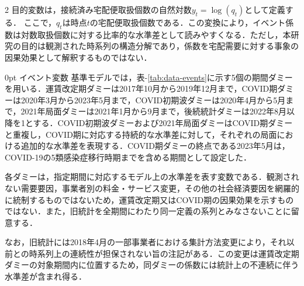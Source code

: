 \documentclass[uplatex,a4paper,10pt]{jsarticle}
\makeatletter
\renewcommand{\subsection}{\@startsection{subsection}{2}{\z@}%
  {\baselineskip}{0pt}%
  {\normalfont\gtfamily\bfseries\fontsize{10pt}{12pt}\selectfont}}
\makeatother
\begin{document}
\begin{multicols}{2}
目的変数は，接続済み宅配便取扱個数の自然対数$y_t=\log(q_t)$として定義する．
ここで，$q_t$は時点$t$の宅配便取扱個数である．この変換により，イベント係数は対数取扱個数に対する比率的な水準差として読みやすくなる．ただし，本研究の目的は観測された時系列の構造分解であり，係数を宅配需要に対する事象の因果効果として解釈するものではない．

\subsection{イベント変数}
基準モデルでは，表-\ref{tab:data-events}に示す5個の期間ダミーを用いる．運賃改定期ダミーは2017年10月から2019年12月まで，COVID期ダミーは2020年3月から2023年5月まで，COVID初期波ダミーは2020年4月から5月まで，2021年局面ダミーは2021年1月から9月まで，後続統計ダミーは2022年8月以降を1とする．COVID初期波ダミーおよび2021年局面ダミーはCOVID期ダミーと重複し，COVID期に対応する持続的な水準差に対して，それぞれの局面における追加的な水準差を表現する．COVID期ダミーの終点である2023年5月は，COVID-19の5類感染症移行時期\cite{mhlw_covid5rui}までを含める期間として設定した．

各ダミーは，指定期間に対応するモデル上の水準差を表す変数である．観測されない需要要因，事業者別の料金・サービス変更，その他の社会経済要因を網羅的に統制するものではないため，運賃改定期又はCOVID期の因果効果を示すものではない．また，旧統計を全期間にわたり同一定義の系列とみなさないことに留意する．

なお，旧統計には2018年4月の一部事業者における集計方法変更により，それ以前との時系列上の連続性が担保されない旨の注記がある．この変更は運賃改定期ダミーの対象期間内に位置するため，同ダミーの係数には統計上の不連続に伴う水準差が含まれ得る．


\end{multicols}
\end{document}
